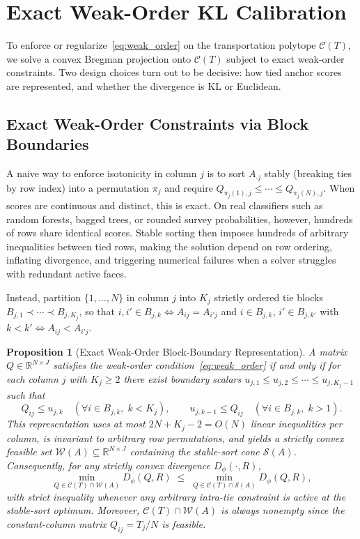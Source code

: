 \documentclass[11pt]{article}
\newtheorem{proposition}{Proposition}
\begin{document}
\section{Exact Weak-Order KL Calibration}

To enforce or regularize~\eqref{eq:weak_order} on the transportation polytope $\mathcal{C}(T)$, we solve a convex Bregman projection onto $\mathcal{C}(T)$ subject to exact weak-order constraints. Two design choices turn out to be decisive: how tied anchor scores are represented, and whether the divergence is KL or Euclidean.

\subsection{Exact Weak-Order Constraints via Block Boundaries}

A naive way to enforce isotonicity in column $j$ is to sort $A_{\cdot j}$ stably (breaking ties by row index) into a permutation $\pi_j$ and require $Q_{\pi_j(1),j} \le \cdots \le Q_{\pi_j(N),j}$. When scores are continuous and distinct, this is exact. On real classifiers such as random forests, bagged trees, or rounded survey probabilities, however, hundreds of rows share identical scores. Stable sorting then imposes hundreds of arbitrary inequalities between tied rows, making the solution depend on row ordering, inflating divergence, and triggering numerical failures when a solver struggles with redundant active faces.

Instead, partition $\{1,\dots,N\}$ in column $j$ into $K_j$ strictly ordered tie blocks $B_{j,1} \prec \cdots \prec B_{j,K_j}$, so that $i, i' \in B_{j,k} \iff A_{ij} = A_{i'j}$ and $i \in B_{j,k},\, i' \in B_{j,k'}$ with $k < k' \iff A_{ij} < A_{i'j}$.

\begin{proposition}[Exact Weak-Order Block-Boundary Representation]
\label{prop:ties}
A matrix $Q \in \mathbb{R}^{N \times J}$ satisfies the weak-order condition~\eqref{eq:weak_order} if and only if for each column $j$ with $K_j \ge 2$ there exist boundary scalars $u_{j,1} \le u_{j,2} \le \cdots \le u_{j,K_j - 1}$ such that
\begin{equation}
Q_{ij} \le u_{j,k} \quad (\forall i \in B_{j,k},\; k < K_j),
\qquad
u_{j,k-1} \le Q_{ij} \quad (\forall i \in B_{j,k},\; k > 1).
\label{eq:boundaries}
\end{equation}
This representation uses at most $2N + K_j - 2 = O(N)$ linear inequalities per column, is invariant to arbitrary row permutations, and yields a strictly convex feasible set $\mathcal{W}(A) \subseteq \mathbb{R}^{N \times J}$ containing the stable-sort cone $\mathcal{S}(A)$. Consequently, for any strictly convex divergence $D_\phi(\cdot, R)$,
\[
\min_{Q \in \mathcal{C}(T) \cap \mathcal{W}(A)} D_\phi(Q, R) \;\le\; \min_{Q \in \mathcal{C}(T) \cap \mathcal{S}(A)} D_\phi(Q, R),
\]
with strict inequality whenever any arbitrary intra-tie constraint is active at the stable-sort optimum. Moreover, $\mathcal{C}(T) \cap \mathcal{W}(A)$ is always nonempty since the constant-column matrix $Q_{ij} = T_j/N$ is feasible.
\end{proposition}
\end{document}
